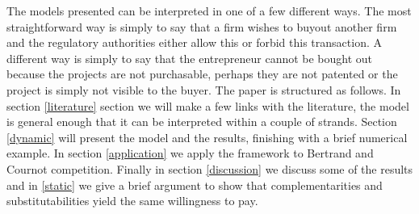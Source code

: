 \documentclass[12pt]{report}
\numberwithin{equation}{section}
\begin{document}
The models presented can be interpreted in one of a few different ways. The most straightforward way is simply to say that a firm wishes to buyout another firm and the regulatory authorities either allow this or forbid this transaction. A different way is simply to say that the entrepreneur cannot be bought out because the projects are not purchasable, perhaps they are not patented or the project is simply not visible to the buyer. 
The paper is structured as follows. 
In section \ref{literature} section we will make a few links with the literature, the model is general enough that it can be interpreted within a couple of strands. Section \ref{dynamic} will present the model and the results, finishing with a brief numerical example. In section \ref{application} we apply the framework to Bertrand and Cournot competition. Finally in section \ref{discussion} we discuss some of the results and in \ref{static} we give a brief argument to show that complementarities and substitutabilities yield the same willingness to pay.
\end{document}
